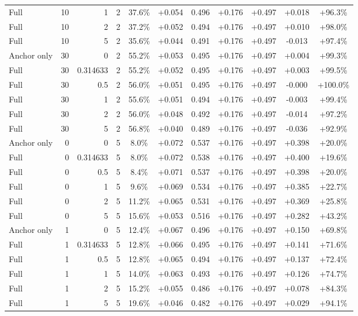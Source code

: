 \begin{table}[htbp]
\begin{tabular}{lrrrccccccc}
Full & 10 & 1 & 2 & 37.6\% & +0.054 & 0.496 & +0.176 & +0.497 & +0.018 & +96.3\% \\
Full & 10 & 2 & 2 & 37.2\% & +0.052 & 0.494 & +0.176 & +0.497 & +0.010 & +98.0\% \\
Full & 10 & 5 & 2 & 35.6\% & +0.044 & 0.491 & +0.176 & +0.497 & -0.013 & +97.4\% \\
Anchor only & 30 & 0 & 2 & 55.2\% & +0.053 & 0.495 & +0.176 & +0.497 & +0.004 & +99.3\% \\
Full & 30 & 0.314633 & 2 & 55.2\% & +0.052 & 0.495 & +0.176 & +0.497 & +0.003 & +99.5\% \\
Full & 30 & 0.5 & 2 & 56.0\% & +0.051 & 0.495 & +0.176 & +0.497 & -0.000 & +100.0\% \\
Full & 30 & 1 & 2 & 55.6\% & +0.051 & 0.494 & +0.176 & +0.497 & -0.003 & +99.4\% \\
Full & 30 & 2 & 2 & 56.0\% & +0.048 & 0.492 & +0.176 & +0.497 & -0.014 & +97.2\% \\
Full & 30 & 5 & 2 & 56.8\% & +0.040 & 0.489 & +0.176 & +0.497 & -0.036 & +92.9\% \\
Anchor only & 0 & 0 & 5 & 8.0\% & +0.072 & 0.537 & +0.176 & +0.497 & +0.398 & +20.0\% \\
Full & 0 & 0.314633 & 5 & 8.0\% & +0.072 & 0.538 & +0.176 & +0.497 & +0.400 & +19.6\% \\
Full & 0 & 0.5 & 5 & 8.4\% & +0.071 & 0.537 & +0.176 & +0.497 & +0.398 & +20.0\% \\
Full & 0 & 1 & 5 & 9.6\% & +0.069 & 0.534 & +0.176 & +0.497 & +0.385 & +22.7\% \\
Full & 0 & 2 & 5 & 11.2\% & +0.065 & 0.531 & +0.176 & +0.497 & +0.369 & +25.8\% \\
Full & 0 & 5 & 5 & 15.6\% & +0.053 & 0.516 & +0.176 & +0.497 & +0.282 & +43.2\% \\
Anchor only & 1 & 0 & 5 & 12.4\% & +0.067 & 0.496 & +0.176 & +0.497 & +0.150 & +69.8\% \\
Full & 1 & 0.314633 & 5 & 12.8\% & +0.066 & 0.495 & +0.176 & +0.497 & +0.141 & +71.6\% \\
Full & 1 & 0.5 & 5 & 12.8\% & +0.065 & 0.494 & +0.176 & +0.497 & +0.137 & +72.4\% \\
Full & 1 & 1 & 5 & 14.0\% & +0.063 & 0.493 & +0.176 & +0.497 & +0.126 & +74.7\% \\
Full & 1 & 2 & 5 & 15.2\% & +0.055 & 0.486 & +0.176 & +0.497 & +0.078 & +84.3\% \\
Full & 1 & 5 & 5 & 19.6\% & +0.046 & 0.482 & +0.176 & +0.497 & +0.029 & +94.1\% \\

\end{tabular}
\end{table}
